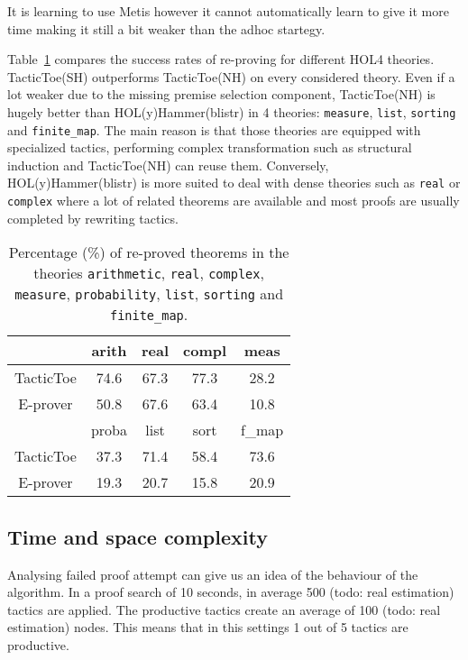 \documentclass[runningheads,a4paper,draft]{svjour3}
\def\holfour{\textsf{HOL4}\xspace}
\def\eprover{\textsf{E-prover}\xspace}
\def\holyhammer{\textsf{HOL(y)Hammer}\xspace}
\def\metis{\textsf{Metis}\xspace}
\def\tactictoe{\textsf{TacticToe}\xspace}
\begin{document}
It is learning to use \metis however it cannot automatically learn to give it 
more time making it still a bit weaker than the adhoc startegy.



Table~\ref{theories} compares the success rates of re-proving for different
\holfour theories. \tactictoe(SH) outperforms \tactictoe(NH) on every 
considered theory.
Even if a lot weaker due to the missing premise selection component, 
\tactictoe(NH)
is hugely better than \holyhammer(blistr) in 4 theories: \texttt{measure}, 
\texttt{list}, \texttt{sorting} and \texttt{finite\_map}. The main reason is 
that 
those theories are equipped with specialized tactics, performing complex 
transformation such as structural induction and \tactictoe(NH) can reuse them. 
Conversely, \holyhammer(blistr) is more suited to deal with dense theories such 
as 
\texttt{real} or \texttt{complex} where a lot of related theorems are available 
and 
most proofs are usually completed by rewriting tactics.

\begin{table}[]
\centering
\setlength{\tabcolsep}{3mm}
\begin{tabular}{@{}ccccc@{}}
\toprule
\phantom{ab} & {arith} & {real} & {compl} 
& {meas} \\
\midrule
\tactictoe & 74.6 & 67.3 & 77.3 & 28.2\\
\eprover & 50.8 & 67.6 & 63.4 & 10.8\\
\midrule
\phantom{abc}  & {proba} & {list} & {sort} & {f\_map} \\
\midrule
\tactictoe & 37.3 & 71.4 & 58.4 & 73.6 \\
\eprover & 19.3 & 20.7 & 15.8 & 20.9 \\
\bottomrule
\end{tabular}
\caption{\label{theories}Percentage (\%) of re-proved theorems in the theories 
\texttt{arithmetic}, \texttt{real}, \texttt{complex}, \texttt{measure},  
\texttt{probability}, \texttt{list}, \texttt{sorting} and \texttt{finite\_map}. 
}
\end{table}  


\subsection{Time and space complexity}

Analysing failed proof attempt can give us an idea of the behaviour of the 
algorithm. In a proof search of 10 seconds, in average 500 (todo: real 
estimation) tactics are applied.
The productive tactics create an average of 100 (todo: real estimation) nodes. 
This means that in this settings 1 out of 5 tactics are productive.
\end{document}
